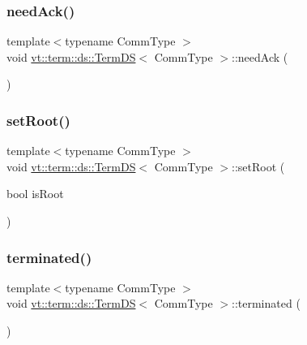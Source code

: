 \subsubsection{\texorpdfstring{need\+Ack()}{needAck()}}
{\footnotesize\ttfamily template$<$typename Comm\+Type $>$ \\
void \hyperlink{structvt_1_1term_1_1ds_1_1_term_d_s}{vt\+::term\+::ds\+::\+Term\+DS}$<$ Comm\+Type $>$\+::need\+Ack (\begin{DoxyParamCaption}{ }\end{DoxyParamCaption})}

\mbox{\label{structvt_1_1term_1_1ds_1_1_term_d_s_a684dd240eeab7ef4c2d1477840276f28}} 
\subsubsection{\texorpdfstring{set\+Root()}{setRoot()}}
{\footnotesize\ttfamily template$<$typename Comm\+Type $>$ \\
void \hyperlink{structvt_1_1term_1_1ds_1_1_term_d_s}{vt\+::term\+::ds\+::\+Term\+DS}$<$ Comm\+Type $>$\+::set\+Root (\begin{DoxyParamCaption}\item[{bool}]{is\+Root }\end{DoxyParamCaption})}

\mbox{\label{structvt_1_1term_1_1ds_1_1_term_d_s_acf4896eceb679d2ee46f5cc0ff1420e3}} 
\subsubsection{\texorpdfstring{terminated()}{terminated()}}
{\footnotesize\ttfamily template$<$typename Comm\+Type $>$ \\
void \hyperlink{structvt_1_1term_1_1ds_1_1_term_d_s}{vt\+::term\+::ds\+::\+Term\+DS}$<$ Comm\+Type $>$\+::terminated (\begin{DoxyParamCaption}{ }\end{DoxyParamCaption})}

